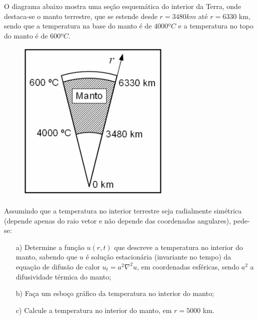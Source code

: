 \linespread{1.5}

O diagrama abaixo mostra uma seção esquemática do interior da Terra, onde destaca-se o manto terrestre, que se estende desde $r = 3480 km$ até $r = 6330$ km, sendo que a temperatura na base do manto é de $4000ºC$ e a temperatura no topo do manto é de $600ºC$.
\begin{figure}[H]
    \centering
    \includegraphics[width = 0.3\linewidth]{fig/edp16.png}
    \label{fig:edp16}
\end{figure}

Assumindo que a temperatura no interior terrestre seja radialmente simétrica (depende apenas do raio vetor e não depende das coordenadas angulares), pede-se:
\begin{itemize}
    \item[a)] Determine a função $u(r,t)$ que descreve a temperatura no interior do manto, sabendo que $u$ é solução estacionária (invariante no tempo) da equação de difusão de calor $u_t = a^2\nabla^2 u$, em coordenadas esféricas, sendo $a^2$ a difusividade térmica do manto; 
    \item[b)] Faça um esboço gráfico da temperatura no interior do manto;
    \item[c)] Calcule a temperatura no interior do manto, em $r=5000$ km.
\end{itemize}